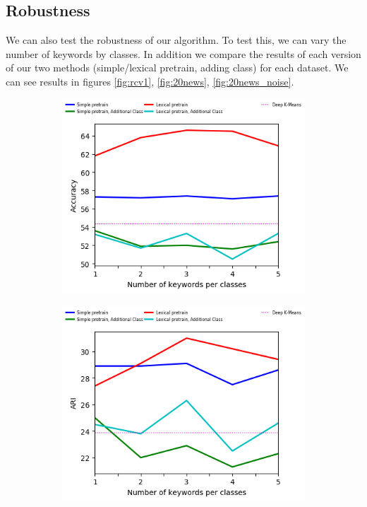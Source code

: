 \subsection{Robustness}
We can also test the robustness of our algorithm. To test this, we
can vary the number of keywords by classes. In addition we compare
the results of each version of our two methods (simple/lexical pretrain, adding 
class) for each dataset.
We can see results  in 
figures \ref{fig:rcv1}, \ref{fig:20news}, \ref{fig:20news_noise}.
\begin{figure}[!h]
  \begin{subfigure}[b]{\textwidth}
    \centering
    \includegraphics[scale=0.82]{parts/res/dat_file/acc/RCV1_ACC.png}     
  \end{subfigure}
  \begin{subfigure}[b]{\textwidth}
    \centering
    \includegraphics[scale=0.82]{parts/res/dat_file/ari/RCV1_ARI.png}     

\end{subfigure}
\end{figure}
